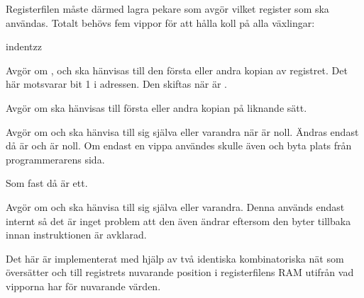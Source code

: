 \documentclass[main.tex]{subfiles}
\begin{document}
Registerfilen måste därmed lagra pekare som avgör vilket register som ska
användas. Totalt behövs fem vippor för att hålla koll på alla växlingar:
\begin{labeling}{indentzz}
\item[\mono{reg}]
    Avgör om ,  och  ska hänvisas till den första
    eller andra kopian av registret. Det här motsvarar bit 1 i adressen. Den
    skiftas när  är .
\item[\mono{af}]
    Avgör om  ska hänvisas till första eller andra kopian på liknande
    sätt.
\item[\mono{dehl0}]
    Avgör om  och  ska hänvisa till sig själva eller varandra
    när  är noll. Ändras endast då  är  och
     är noll. Om endast en vippa användes skulle även  och
     byta plats från programmerarens sida.
\item[\mono{dehl1}]
    Som  fast då  är ett.
\item[\mono{afwz}]
    Avgör om  och  ska hänvisa till sig själva eller
    varandra. Denna används endast internt så det är inget problem att den även
    ändrar  eftersom den byter tillbaka innan instruktionen är
    avklarad.
\end{labeling}

Det här är implementerat med hjälp av två identiska kombinatoriska nät som
översätter  och  till registrets nuvarande position i
registerfilens RAM utifrån vad vipporna har för nuvarande värden.

\end{document}
